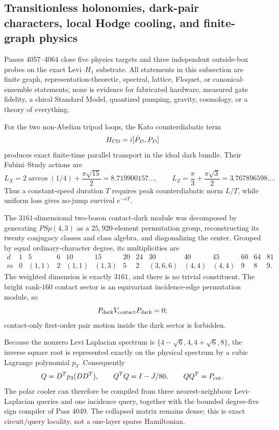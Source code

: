 \subsection{Transitionless holonomies, dark-pair characters, local Hodge cooling, and finite-graph physics}
\label{sec:bt4057-4064}

Passes 4057--4064 close five physics targets and three independent outside-box probes on the exact Levi--$H_1$ substrate.  All statements in this subsection are finite graph, representation-theoretic, spectral, lattice, Floquet, or canonical-ensemble statements; none is evidence for fabricated hardware, measured gate fidelity, a chiral Standard Model, quantized pumping, gravity, cosmology, or a theory of everything.

For the two non-Abelian tripod loops, the Kato counterdiabatic term
\[
 H_{\rm CD}=i[\dot P_D,P_D]
\]
produces exact finite-time parallel transport in the ideal dark bundle.  Their Fubini--Study actions are
\[
 L_X=2\arccos(1/4)+\frac{\pi\sqrt{15}}2=8.719900157\ldots,
 \qquad
 L_Z=\frac\pi3+\frac{\pi\sqrt3}{2}=3.767896598\ldots .
\]
Thus a constant-speed duration $T$ requires peak counterdiabatic norm $L/T$, while uniform loss gives no-jump survival $e^{-\kappa T}$.

The $3161$-dimensional two-boson contact-dark module was decomposed by generating $PSp(4,3)$ as a $25{,}920$-element permutation group, reconstructing its twenty conjugacy classes and class algebra, and diagonalizing the center.  Grouped by equal ordinary-character degree, its multiplicities are
\[
\begin{array}{c|ccccccccccccc}
 d&1&5&6&10&15&20&24&30&40&45&60&64&81\\ \hline
 m&0&(1,1)&2&(1,1)&(1,3)&5&2&(3,6,6)&(4,4)&(4,4)&9&8&9.
\end{array}
\]
The weighted dimension is exactly $3161$, and there is no trivial constituent.  The bright rank-$160$ contact sector is an equivariant incidence-edge permutation module, so
\[
 P_{\rm dark}V_{\rm contact}P_{\rm dark}=0;
\]
contact-only first-order pair motion inside the dark sector is forbidden.

Because the nonzero Levi Laplacian spectrum is $\{4-\sqrt6,4,4+\sqrt6,8\}$, the inverse square root is represented exactly on the physical spectrum by a cubic Lagrange polynomial $p_3$.  Consequently
\[
 Q=D^Tp_3(DD^T),\qquad Q^TQ=I-J/80,\qquad QQ^T=P_{\rm cut}.
\]
The polar cooler can therefore be compiled from three nearest-neighbour Levi-Laplacian queries and one incidence query, together with the bounded degree-five sign compiler of Pass 4049.  The collapsed matrix remains dense; this is exact circuit/query locality, not a one-layer sparse Hamiltonian.

